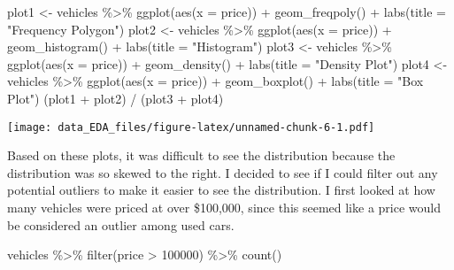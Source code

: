 \documentclass[
]{article}
\newenvironment{Shaded}{\begin{snugshade}}{\end{snugshade}}
\newcommand{\AttributeTok}[1]{\textcolor[rgb]{0.77,0.63,0.00}{#1}}
\newcommand{\DecValTok}[1]{\textcolor[rgb]{0.00,0.00,0.81}{#1}}
\newcommand{\FunctionTok}[1]{\textcolor[rgb]{0.00,0.00,0.00}{#1}}
\newcommand{\NormalTok}[1]{#1}
\newcommand{\OtherTok}[1]{\textcolor[rgb]{0.56,0.35,0.01}{#1}}
\newcommand{\SpecialCharTok}[1]{\textcolor[rgb]{0.00,0.00,0.00}{#1}}
\newcommand{\StringTok}[1]{\textcolor[rgb]{0.31,0.60,0.02}{#1}}
\begin{document}
\begin{Shaded}
\begin{Highlighting}[]
\NormalTok{plot1 }\OtherTok{\textless{}{-}}\NormalTok{ vehicles }\SpecialCharTok{\%\textgreater{}\%} 
  \FunctionTok{ggplot}\NormalTok{(}\FunctionTok{aes}\NormalTok{(}\AttributeTok{x =}\NormalTok{ price)) }\SpecialCharTok{+} 
  \FunctionTok{geom\_freqpoly}\NormalTok{() }\SpecialCharTok{+} 
  \FunctionTok{labs}\NormalTok{(}\AttributeTok{title =} \StringTok{"Frequency Polygon"}\NormalTok{)}
\NormalTok{plot2 }\OtherTok{\textless{}{-}}\NormalTok{ vehicles }\SpecialCharTok{\%\textgreater{}\%} 
  \FunctionTok{ggplot}\NormalTok{(}\FunctionTok{aes}\NormalTok{(}\AttributeTok{x =}\NormalTok{ price)) }\SpecialCharTok{+} 
  \FunctionTok{geom\_histogram}\NormalTok{() }\SpecialCharTok{+} 
  \FunctionTok{labs}\NormalTok{(}\AttributeTok{title =} \StringTok{"Histogram"}\NormalTok{)}
\NormalTok{plot3 }\OtherTok{\textless{}{-}}\NormalTok{ vehicles }\SpecialCharTok{\%\textgreater{}\%} 
  \FunctionTok{ggplot}\NormalTok{(}\FunctionTok{aes}\NormalTok{(}\AttributeTok{x =}\NormalTok{ price)) }\SpecialCharTok{+} 
  \FunctionTok{geom\_density}\NormalTok{() }\SpecialCharTok{+} 
  \FunctionTok{labs}\NormalTok{(}\AttributeTok{title =} \StringTok{"Density Plot"}\NormalTok{)}
\NormalTok{plot4 }\OtherTok{\textless{}{-}}\NormalTok{ vehicles }\SpecialCharTok{\%\textgreater{}\%} 
  \FunctionTok{ggplot}\NormalTok{(}\FunctionTok{aes}\NormalTok{(}\AttributeTok{x =}\NormalTok{ price)) }\SpecialCharTok{+} 
  \FunctionTok{geom\_boxplot}\NormalTok{() }\SpecialCharTok{+} 
  \FunctionTok{labs}\NormalTok{(}\AttributeTok{title =} \StringTok{"Box Plot"}\NormalTok{)}
\NormalTok{(plot1 }\SpecialCharTok{+}\NormalTok{ plot2) }\SpecialCharTok{/}\NormalTok{ (plot3 }\SpecialCharTok{+}\NormalTok{ plot4)}
\end{Highlighting}
\end{Shaded}

\texttt{[image: data\_EDA\_files/figure-latex/unnamed-chunk-6-1.pdf]}

Based on these plots, it was difficult to see the distribution because
the distribution was so skewed to the right. I decided to see if I could
filter out any potential outliers to make it easier to see the
distribution. I first looked at how many vehicles were priced at over
\$100,000, since this seemed like a price would be considered an outlier
among used cars.

\begin{Shaded}
\begin{Highlighting}[]
\NormalTok{vehicles }\SpecialCharTok{\%\textgreater{}\%} 
  \FunctionTok{filter}\NormalTok{(price }\SpecialCharTok{\textgreater{}} \DecValTok{100000}\NormalTok{) }\SpecialCharTok{\%\textgreater{}\%} 
  \FunctionTok{count}\NormalTok{()}
\end{Highlighting}
\end{Shaded}
\end{document}

